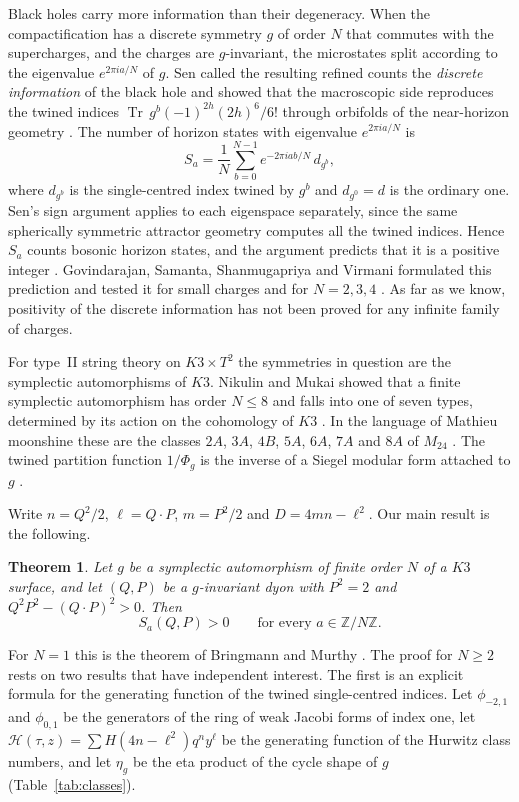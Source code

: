 \documentclass[11pt]{amsart}
\newtheorem{mainthm}{Theorem}
\theoremstyle{definition}
\newcommand{\ZZ}{\mathbb{Z}}
\newcommand{\cH}{\mathcal H}
\begin{document}
Black holes carry more information than their degeneracy. When the compactification has a discrete symmetry $g$ of order $N$ that commutes with the supercharges, and the charges are $g$-invariant, the microstates split according to the eigenvalue $e^{2\pi i a/N}$ of $g$. Sen called the resulting refined counts the \emph{discrete information} of the black hole and showed that the macroscopic side reproduces the twined indices $\operatorname{Tr}\,g^b(-1)^{2h}(2h)^6/6!$ through orbifolds of the near-horizon geometry \cite{Sen10}. The number of horizon states with eigenvalue $e^{2\pi ia/N}$ is
\begin{equation}\label{eq:Sa}
S_a=\frac1N\sum_{b=0}^{N-1}e^{-2\pi i ab/N}\,d_{g^b},
\end{equation}
where $d_{g^b}$ is the single-centred index twined by $g^b$ and $d_{g^0}=d$ is the ordinary one. Sen's sign argument applies to each eigenspace separately, since the same spherically symmetric attractor geometry computes all the twined indices. Hence $S_a$ counts bosonic horizon states, and the argument predicts that it is a positive integer \cite[Section~1]{GSSV23}. Govindarajan, Samanta, Shanmugapriya and Virmani formulated this prediction and tested it for small charges and for $N=2,3,4$ \cite{GSSV23}. As far as we know, positivity of the discrete information has not been proved for any infinite family of charges.

For type~II string theory on $K3\times T^2$ the symmetries in question are the symplectic automorphisms of $K3$. Nikulin and Mukai showed that a finite symplectic automorphism has order $N\le 8$ and falls into one of seven types, determined by its action on the cohomology of $K3$ \cite{Nik79,Muk88}. In the language of Mathieu moonshine these are the classes $2A$, $3A$, $4B$, $5A$, $6A$, $7A$ and $8A$ of $M_{24}$ \cite{EOT11,Che10,GHV10,Gan16}. The twined partition function $1/\Phi_g$ is the inverse of a Siegel modular form attached to $g$ \cite{DJS07,Sen10,Gov11,GK10,Che10,Rau13,PV14}.

Write $n=Q^2/2$, $\ell=Q\cdot P$, $m=P^2/2$ and $D=4mn-\ell^2$. Our main result is the following.

\begin{mainthm}\label{thm:A}
Let $g$ be a symplectic automorphism of finite order $N$ of a $K3$ surface, and let $(Q,P)$ be a $g$-invariant dyon with $P^2=2$ and $Q^2P^2-(Q\cdot P)^2>0$. Then
\[
S_a(Q,P)>0\qquad\text{for every } a\in\ZZ/N\ZZ .
\]
\end{mainthm}

For $N=1$ this is the theorem of Bringmann and Murthy \cite{BM13}. The proof for $N\ge2$ rests on two results that have independent interest. The first is an explicit formula for the generating function of the twined single-centred indices. Let $\phi_{-2,1}$ and $\phi_{0,1}$ be the generators of the ring of weak Jacobi forms of index one, let $\cH(\tau,z)=\sum H(4n-\ell^2)q^ny^\ell$ be the generating function of the Hurwitz class numbers, and let $\eta_g$ be the eta product of the cycle shape of $g$ (Table~\ref{tab:classes}).
\end{document}
